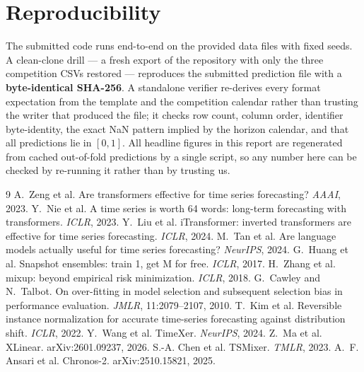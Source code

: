 \documentclass[10pt,letterpaper,twocolumn]{article}
\begin{document}
\section{Reproducibility}

The submitted code runs end-to-end on the provided data files with fixed seeds.
A clean-clone drill --- a fresh export of the repository with only the three
competition CSVs restored --- reproduces the submitted prediction file with a
\textbf{byte-identical SHA-256}. A standalone verifier re-derives every format
expectation from the template and the competition calendar rather than trusting
the writer that produced the file; it checks row count, column order, identifier
byte-identity, the exact NaN pattern implied by the horizon calendar, and that
all predictions lie in $[0,1]$. All headline figures in this report are
regenerated from cached out-of-fold predictions by a single script, so any number
here can be checked by re-running it rather than by trusting us.

{\footnotesize
\begin{thebibliography}{9}\small
{} A.~Zeng et al. Are transformers effective for time series
forecasting? \emph{AAAI}, 2023.
 Y.~Nie et al. A time series is worth 64 words: long-term
forecasting with transformers. \emph{ICLR}, 2023.
 Y.~Liu et al. iTransformer: inverted transformers are effective
for time series forecasting. \emph{ICLR}, 2024.
 M.~Tan et al. Are language models actually useful for time series
forecasting? \emph{NeurIPS}, 2024.
 G.~Huang et al. Snapshot ensembles: train 1, get M for free.
\emph{ICLR}, 2017.
 H.~Zhang et al. mixup: beyond empirical risk minimization.
\emph{ICLR}, 2018.
 G.~Cawley and N.~Talbot. On over-fitting in model selection and
subsequent selection bias in performance evaluation. \emph{JMLR}, 11:2079--2107,
2010.
 T.~Kim et al. Reversible instance normalization for accurate
time-series forecasting against distribution shift. \emph{ICLR}, 2022.
 Y.~Wang et al. TimeXer. \emph{NeurIPS}, 2024.
 Z.~Ma et al. XLinear. arXiv:2601.09237, 2026.
 S.-A. Chen et al. TSMixer. \emph{TMLR}, 2023.
 A.~F. Ansari et al. Chronos-2. arXiv:2510.15821, 2025.
\end{thebibliography}}
\end{document}
